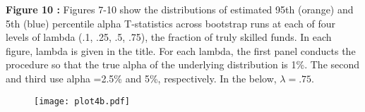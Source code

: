 \documentclass{article}
\begin{document}
\clearpage 
\textbf{Figure 10 : }Figures 7-10 show the distributions of estimated 95th (orange) and 5th (blue) percentile alpha T-statistics across bootstrap runs at each of four levels of lambda (.1, .25, .5, .75), the fraction of truly skilled funds.  In each figure, lambda is given in the title.  For each lambda, the first panel conducts the procedure so that the true alpha of the underlying distribution is 1\%.  The second and third use alpha =2.5\% and 5\%, respectively.  In the below, $\lambda=.75$.
\begin{center}
 \begin{figure}[h!]
 \texttt{[image: plot4b.pdf]}\label{fig:plot4b}
 \end{figure}
 \end{center}
\clearpage 
\end{document}
